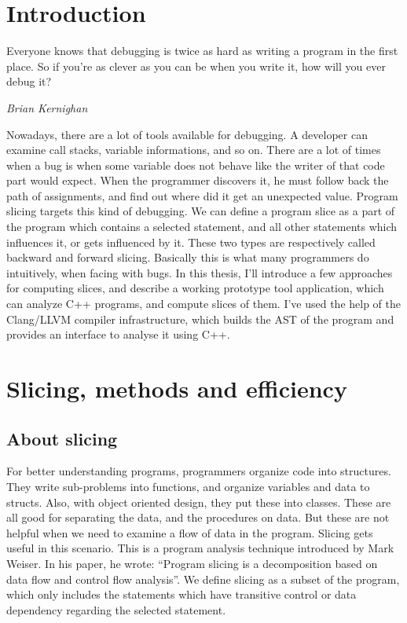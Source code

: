 \documentclass[oneside,12pt,a4paper]{book}
\begin{document}
\chapter{Introduction}
\epigraph{Everyone knows that debugging is twice as hard as writing a program in the first place. So if you're as clever as you can be when you write it, how will you ever debug it?}{\textit{Brian Kernighan}}

Nowadays, there are a lot of tools available for debugging. A developer can examine call stacks, variable informations, and so on. There are a lot of times when a bug is when some variable does not behave like the writer of that code part would expect. When the programmer discovers it, he must follow back the path of assignments, and find out where did it get an unexpected value. Program slicing targets this kind of debugging. We can define a program slice as a part of the program which contains a selected statement, and all other statements which influences it, or gets influenced by it. These two types are respectively called backward and forward slicing. Basically this is what many programmers do intuitively, when facing with bugs. In this thesis, I'll introduce a few approaches for computing slices, and describe a working prototype tool application, which can analyze C++ programs, and compute slices of them. I've used the help of the Clang/LLVM compiler infrastructure, which builds the AST of the program and provides an interface to analyse it using C++.

\chapter{Slicing, methods and efficiency}
\section{About slicing}
For better understanding programs, programmers organize code into structures. They write sub-problems into functions, and organize variables and data to structs. Also, with object oriented design, they put these into classes. These are all good for separating the data, and the procedures on data. But these are not helpful when we need to examine a flow of data in the program. Slicing gets useful in this scenario. This is a program analysis technique introduced by Mark Weiser\cite{weiser84}. In his paper, he wrote: ``Program slicing is a decomposition based on data flow and control flow analysis''. We define slicing as a subset of the program, which only includes the statements which have transitive control or data dependency regarding the selected statement. 
\end{document}
